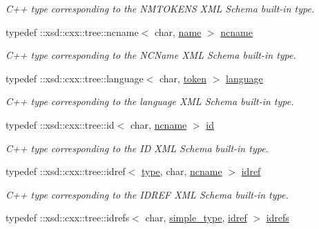 \begin{DoxyCompactItemize}
\begin{DoxyCompactList}\small\item\em C++ type corresponding to the N\+M\+T\+O\+K\+E\+N\+S X\+M\+L Schema built-\/in type. \end{DoxyCompactList}\item 
typedef \+::xsd\+::cxx\+::tree\+::ncname$<$ char, \hyperlink{namespacexml__schema_abefc242069a8a8b837230355cbc238a1}{name} $>$ \hyperlink{namespacexml__schema_a926a5ddb21b27435d0206310d8fc67b7}{ncname}
\begin{DoxyCompactList}\small\item\em C++ type corresponding to the N\+C\+Name X\+M\+L Schema built-\/in type. \end{DoxyCompactList}\item 
typedef \+::xsd\+::cxx\+::tree\+::language$<$ char, \hyperlink{namespacexml__schema_abdb824cb755f58704a95b28f017dd0f7}{token} $>$ \hyperlink{namespacexml__schema_ae05c7556bd944abd5b9b1ab87dd9c325}{language}
\begin{DoxyCompactList}\small\item\em C++ type corresponding to the language X\+M\+L Schema built-\/in type. \end{DoxyCompactList}\item 
typedef \+::xsd\+::cxx\+::tree\+::id$<$ char, \hyperlink{namespacexml__schema_a926a5ddb21b27435d0206310d8fc67b7}{ncname} $>$ \hyperlink{namespacexml__schema_a398fa1a00d828dc3bd1aadf89e68a3fb}{id}
\begin{DoxyCompactList}\small\item\em C++ type corresponding to the I\+D X\+M\+L Schema built-\/in type. \end{DoxyCompactList}\item 
typedef \+::xsd\+::cxx\+::tree\+::idref$<$ \hyperlink{namespacexml__schema_a3d277dc807f2e4ec4261dcef5c04a836}{type}, char, \hyperlink{namespacexml__schema_a926a5ddb21b27435d0206310d8fc67b7}{ncname} $>$ \hyperlink{namespacexml__schema_ac4af625f2450257be84f5475dbfe8fdd}{idref}
\begin{DoxyCompactList}\small\item\em C++ type corresponding to the I\+D\+R\+E\+F X\+M\+L Schema built-\/in type. \end{DoxyCompactList}\item 
typedef \+::xsd\+::cxx\+::tree\+::idrefs$<$ char, \hyperlink{namespacexml__schema_a44789bb4367951bcf8ae867cb983324d}{simple\+\_\+type}, \hyperlink{namespacexml__schema_ac4af625f2450257be84f5475dbfe8fdd}{idref} $>$ \hyperlink{namespacexml__schema_adb5f7e4c5a09caf31f94ace50b148674}{idrefs}

\end{DoxyCompactItemize}
